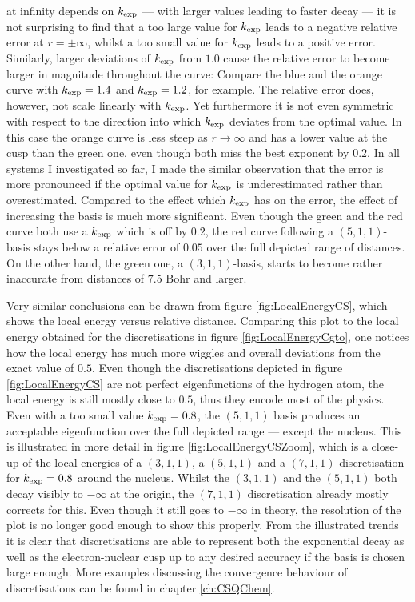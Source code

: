 at infinity depends on $k_\text{exp}$ ---
with larger values leading to faster decay ---
it is not surprising to find that
a too large value for $k_\text{exp}$ leads to a negative relative error at $r = \pm \infty$,
whilst a too small value for $k_\text{exp}$ leads to a positive error.
Similarly, larger deviations of $k_\text{exp}$ from $1.0$
cause the relative error to become larger in magnitude throughout the curve:
Compare the blue and the orange curve with $k_\text{exp} = 1.4$ and $k_\text{exp} = 1.2$,
for example.
The relative error does, however, not scale linearly with $k_\text{exp}$.
Yet furthermore it is not even symmetric with respect to the direction
into which $k_\text{exp}$ deviates from the optimal value.
In this case the orange curve is less steep as $r\to\infty$ and has a lower value
at the cusp than the green one,
even though both miss the best exponent by $0.2$.
In all systems I investigated so far,
I made the similar observation that the error is more pronounced if the optimal
value for $k_\text{exp}$ is underestimated rather than overestimated.
Compared to the effect which $k_\text{exp}$ has on the error,
the effect of increasing the basis is much more significant.
Even though the green and the red curve both use a $k_\text{exp}$
which is off by $0.2$,
the red curve following a $(5,1,1)$-basis
stays below a relative error of $0.05$
over the full depicted range of distances.
On the other hand, the green one, a $(3,1,1)$-basis,
starts to become rather inaccurate from distances
of $7.5$ Bohr and larger.

Very similar conclusions can be drawn
from figure \vref{fig:LocalEnergyCS},
which shows the local energy versus relative distance.
Comparing this plot to the local energy obtained for the \cGTO
discretisations in figure \vref{fig:LocalEnergyCgto},
one notices how the \cGTO local energy has much more wiggles
and overall deviations from the exact value of $0.5$.
Even though the \CS discretisations depicted
in figure \ref{fig:LocalEnergyCS} are not perfect eigenfunctions
of the hydrogen atom,
the local energy is still mostly close to $0.5$,
thus they encode most of the physics.
Even with a too small value $k_\text{exp} = 0.8$,
the $(5,1,1)$ basis produces an acceptable eigenfunction over the full depicted
range --- except the nucleus.
This is illustrated in more detail in figure
\ref{fig:LocalEnergyCSZoom},
which is a close-up of the local energies of a $(3,1,1)$, a $(5,1,1)$
and a $(7,1,1)$ discretisation for $k_\text{exp} = 0.8$
around the nucleus.
Whilst the $(3,1,1)$ and the $(5,1,1)$ both decay visibly to $-\infty$ at the origin,
the $(7,1,1)$ discretisation already mostly corrects for this.
Even though it still goes to $-\infty$ in theory,
the resolution of the plot is no longer good enough to show this properly.
From the illustrated trends it is clear that
\CS discretisations are able to represent
both the exponential decay as well as the electron-nuclear cusp
up to any desired accuracy if the basis is chosen large enough.
More examples discussing the convergence behaviour of
\CS discretisations can be found in chapter \vref{ch:CSQChem}.

